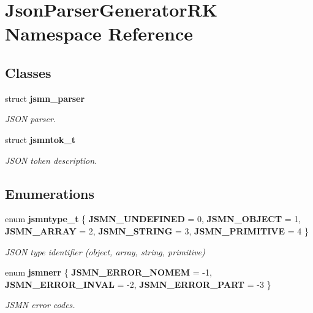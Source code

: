 \section{Json\+Parser\+Generator\+RK Namespace Reference}
\label{namespace_json_parser_generator_r_k}
\subsection*{Classes}
\begin{DoxyCompactItemize}
\item 
struct \textbf{ jsmn\+\_\+parser}
\begin{DoxyCompactList}\small\item\em J\+S\+ON parser. \end{DoxyCompactList}\item 
struct \textbf{ jsmntok\+\_\+t}
\begin{DoxyCompactList}\small\item\em J\+S\+ON token description. \end{DoxyCompactList}\end{DoxyCompactItemize}
\subsection*{Enumerations}
\begin{DoxyCompactItemize}
\item 
enum \textbf{ jsmntype\+\_\+t} \{ \newline
\textbf{ J\+S\+M\+N\+\_\+\+U\+N\+D\+E\+F\+I\+N\+ED} = 0, 
\textbf{ J\+S\+M\+N\+\_\+\+O\+B\+J\+E\+CT} = 1, 
\textbf{ J\+S\+M\+N\+\_\+\+A\+R\+R\+AY} = 2, 
\textbf{ J\+S\+M\+N\+\_\+\+S\+T\+R\+I\+NG} = 3, 
\newline
\textbf{ J\+S\+M\+N\+\_\+\+P\+R\+I\+M\+I\+T\+I\+VE} = 4
 \}\begin{DoxyCompactList}\small\item\em J\+S\+ON type identifier (object, array, string, primitive) \end{DoxyCompactList}
\item 
enum \textbf{ jsmnerr} \{ \textbf{ J\+S\+M\+N\+\_\+\+E\+R\+R\+O\+R\+\_\+\+N\+O\+M\+EM} = -\/1, 
\textbf{ J\+S\+M\+N\+\_\+\+E\+R\+R\+O\+R\+\_\+\+I\+N\+V\+AL} = -\/2, 
\textbf{ J\+S\+M\+N\+\_\+\+E\+R\+R\+O\+R\+\_\+\+P\+A\+RT} = -\/3
 \}\begin{DoxyCompactList}\small\item\em J\+S\+MN error codes. \end{DoxyCompactList}
\end{DoxyCompactItemize}
